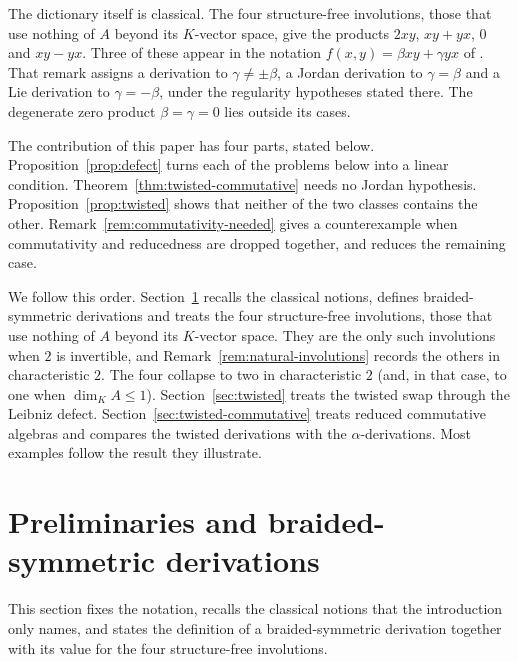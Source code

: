 \documentclass[]{interact}
\theoremstyle{plain}
\theoremstyle{definition}
\theoremstyle{remark}
\begin{document}
The dictionary itself is classical. %
The four structure-free involutions, those that use nothing of $A$ beyond its $K$-vector space, give the products $2xy$, $xy + yx$, $0$ and $xy - yx$.
Three of these appear in the notation $f(x,y) = \beta xy + \gamma yx$ of \citet[Remark 1.4]{Benkovic2015}.
That remark assigns a derivation to $\gamma \ne \pm\beta$, a Jordan derivation to $\gamma = \beta$ and a Lie derivation to $\gamma = -\beta$, under the regularity hypotheses stated there.
The degenerate zero product $\beta = \gamma = 0$ lies outside its cases.

The contribution of this paper has four parts, stated below. %
Proposition~\ref{prop:defect} turns each of the problems below into a linear condition.
Theorem~\ref{thm:twisted-commutative} needs no Jordan hypothesis.
Proposition~\ref{prop:twisted} shows that neither of the two classes contains the other.
Remark~\ref{rem:commutativity-needed} gives a counterexample when commutativity and reducedness are dropped together, and reduces the remaining case.

We follow this order.
Section~\ref{sec:sigma-derivations} recalls the classical notions, defines braided-symmetric derivations and treats the four structure-free involutions, those that use nothing of $A$ beyond its $K$-vector space. They are the only such involutions when $2$ is invertible, and Remark~\ref{rem:natural-involutions} records the others in characteristic $2$. The four collapse to two in characteristic $2$ (and, in that case, to one when $\dim_K A \le 1$).
Section~\ref{sec:twisted} treats the twisted swap through the Leibniz defect.
Section~\ref{sec:twisted-commutative} treats reduced commutative algebras and compares the twisted derivations with the $\alpha$-derivations.
Most examples follow the result they illustrate. %

\section{Preliminaries and braided-symmetric derivations}\label{sec:sigma-derivations}

This section fixes the notation, recalls the classical notions that the introduction only names, and states the definition of a braided-symmetric derivation together with its value for the four structure-free involutions.
\end{document}
